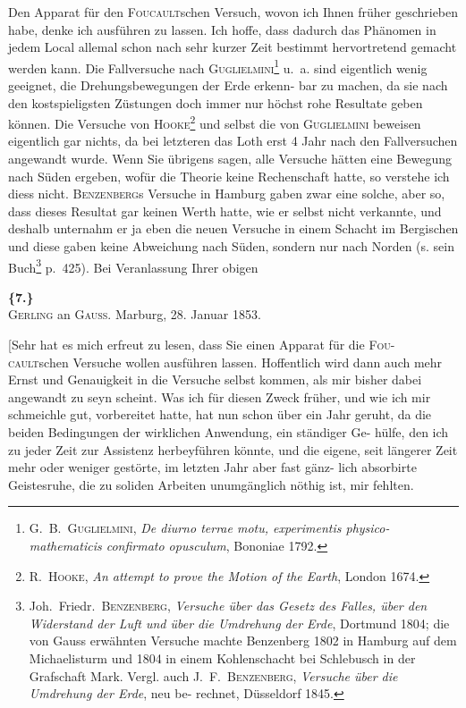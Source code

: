 \documentclass[12pt,a4paper]{article}
\theoremstyle{plain}
\theoremstyle{definition}
\theoremstyle{remark}
\begin{document}
Den Apparat f\"ur den \textsc{Foucault}schen Versuch, wovon ich Ihnen fr\"uher
geschrieben habe, denke ich ausf\"uhren zu lassen. Ich hoffe, dass dadurch
das Ph\"anomen in jedem Local allemal schon nach sehr kurzer Zeit bestimmt
hervortretend gemacht werden kann. Die Fallversuche nach \textsc{Guglielmini}\footnote{G.~B.~\textsc{Guglielmini}, \textit{De diurno terrae motu, experimentis physico-mathematicis confirmato opusculum}, Bononiae 1792.}
u.~a. sind eigentlich wenig geeignet, die Drehungsbewegungen der Erde erkenn-
bar zu machen, da sie nach den kostspieligsten Z\"ustungen doch immer
nur h\"ochst rohe Resultate geben k\"onnen. Die Versuche von \textsc{Hooke}\footnote{R.~\textsc{Hooke}, \textit{An attempt to prove the Motion of the Earth}, London 1674.}
und selbst die von \textsc{Guglielmini} beweisen eigentlich gar nichts, da bei letzteren
das Loth erst 4 Jahr nach den Fallversuchen angewandt wurde. Wenn Sie
\"ubrigens sagen, alle Versuche h\"atten eine Bewegung nach S\"uden ergeben,
wof\"ur die Theorie keine Rechenschaft hatte, so verstehe ich diess nicht.
\textsc{Benzenberg}s Versuche in Hamburg gaben zwar eine solche, aber so, dass
dieses Resultat gar keinen Werth hatte, wie er selbst nicht verkannte, und
deshalb unternahm er ja eben die neuen Versuche in einem Schacht im
Bergischen und diese gaben keine Abweichung nach S\"uden, sondern nur
nach Norden (s. sein Buch\footnote{Joh.~Friedr.~\textsc{Benzenberg}, \textit{Versuche \"uber das Gesetz des Falles, \"uber den Widerstand der Luft und \"uber die Umdrehung der Erde}, Dortmund 1804; die von Gauss erw\"ahnten Versuche machte
Benzenberg 1802 in Hamburg auf dem Michaelisturm und 1804 in einem Kohlenschacht bei Schlebusch
in der Grafschaft Mark. Vergl. auch J.~F.~\textsc{Benzenberg}, \textit{Versuche \"uber die Umdrehung der Erde}, neu be-
rechnet, D\"usseldorf 1845.} p.~425). Bei Veranlassung Ihrer obigen

\vspace{0.5cm}

\noindent\textbf{\{7.\}}\\
\textsc{Gerling} an \textsc{Gauss}. Marburg, 28. Januar 1853.

\vspace{0.3cm}

[Sehr hat es mich erfreut zu lesen, dass Sie einen Apparat f\"ur die \textsc{Fou}-
\textsc{cault}schen Versuche wollen ausf\"uhren lassen. Hoffentlich wird dann auch
mehr Ernst und Genauigkeit in die Versuche selbst kommen, als mir bisher
dabei angewandt zu seyn scheint. Was ich f\"ur diesen Zweck fr\"uher, und wie
ich mir schmeichle gut, vorbereitet hatte, hat nun schon \"uber ein Jahr geruht,
da die beiden Bedingungen der wirklichen Anwendung, ein st\"andiger Ge-
h\"ulfe, den ich zu jeder Zeit zur Assistenz herbeyf\"uhren k\"onnte, und die eigene,
seit l\"angerer Zeit mehr oder weniger gest\"orte, im letzten Jahr aber fast g\"anz-
lich absorbirte Geistesruhe, die zu soliden Arbeiten unumg\"anglich n\"othig ist,
mir fehlten.
\end{document}
